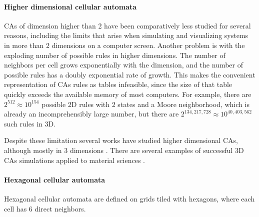 \paragraph{Higher dimensional cellular automata}
\acp{CA} of dimension higher than 2 have been comparatively less studied for
several reasons, including the limits that arise when simulating and visualizing
systems in more than 2 dimensions on a computer screen. Another problem is with
the exploding number of possible rules in higher dimensions. The number of
neighbors per cell grows exponentially with the dimension, and the number of
possible rules has a doubly exponential rate of growth. This makes the
convenient representation of \acp{CA} rules as tables infeasible, since the size
of that table quickly exceeds the available memory of most computers. For
example, there are $2^{512} \approx 10^{154}$ possible 2D rules with 2 states and a
Moore neighborhood, which is already an incomprehensibly large number, but there
are $2^{134,217,728} \approx 10^{40,403,562}$ such rules in 3D.

Despite these limitation several works have studied higher dimensional \acp{CA},
although mostly in 3 dimensions
\parencite{tsalidesThreedimensionalCellularAutomata1989,
  sudhakaranGrowing3DArtefacts2021}. There are several examples of successful
3D \acp{CA} simulations applied to material sciences
\parencite{gandin3DCellularAutomaton1997, arataFreeformShapeModeling1999,
  panStudyFailureScale2009, dicaprio3DCellularAutomata2016}.

\paragraph{Hexagonal cellular automata}
Hexagonal cellular automata are defined on grids tiled with hexagons, where each
cell has 6 direct neighbors.

